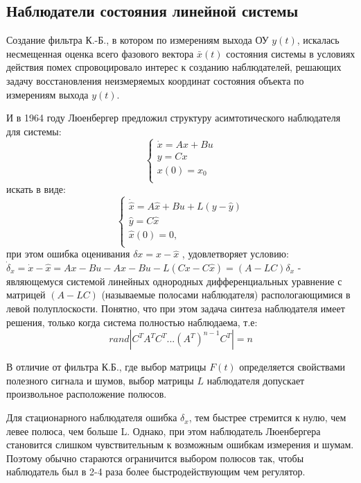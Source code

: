\documentclass[preprint,russian,a5paper,10pt,twoside,mediummath]{ncc}
\begin{document}
	\subsection{Наблюдатели состояния линейной системы\label{stochastic:observers}}
\par Создание фильтра К.-Б., в котором по измерениям выхода ОУ $y(t)$, искалась несмещенная оценка всего фазового вектора $\bar{x}(t)$ состояния системы в условиях действия помех спровоцировало интерес к созданию наблюдателей, решающих задачу восстановления неизмеряемых координат состояния объекта по измерениям выхода $y(t)$.
\par И в 1964 году Люенбергер предложил структуру асимтотического наблюдателя для системы:
\[\left\{ \begin{array}{*{35}{l}}
   \dot{x}=Ax+Bu  \\
   y=Cx  \\
   x(0)={{x}_{0}}  \\
\end{array} \right.\]
искать в виде:
\[\left\{ \begin{array}{*{35}{l}}
   \dot{\hat{x}}=A\hat{x}+Bu+L(y-\hat{y})  \\
   \hat{y}=C\hat{x}  \\
   \hat{x}(0)=0,  \\
\end{array} \right.\]
при этом ошибка оценивания $\delta x=x-\hat{x}$ ,
удовлетворяет условию: ${{\dot{\delta }}_{x}}=\dot{x}-\hat{x}=Ax-Bu-A\hat{x}-Bu-L(Cx-C\hat{x})=(A-LC){{\delta }_{x}}$ - являющемуся системой линейных однородных дифференциальных уравнение с матрицей 
$\left( A-LC \right)$
(называемые полосами наблюдателя) распологающимися в левой полуплоскости. Понятно, что при этом задача синтеза наблюдателя имеет решения, только когда система полностью наблюдаема, т.е: 
\[rand|{{C}^{T}}{{A}^{T}}{{C}^{T}}...{{({{A}^{T}})}^{n-1}}{{C}^{T}}|=n\] 
\par В отличие от фильтра К.Б., где выбор матрицы $F(t)$ 
определяется свойствами полезного сигнала и шумов, выбор матрицы $L$ 
наблюдателя допускает произвольное расположение полюсов. 
\par Для стационарного наблюдателя ошибка ${{\delta }_{x}}$, тем быстрее стремится к нулю, чем левее полюса, чем больше L. Однако, при этом наблюдатель Люенбергера становится слишком чувствительным к возможным ошибкам измерения и шумам. Поэтому обычно стараются ограничится  выбором полюсов так, чтобы наблюдатель был в 2-4 раза более быстродействующим чем регулятор. 
\end{document}
